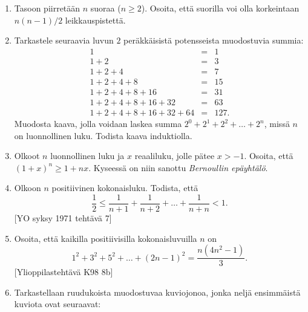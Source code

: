 \begin{enumerate}
\item Tasoon piirretään $n$ suoraa ($n\ge 2$). Osoita, että suorilla voi olla korkeintaan $n(n - 1)/2$ leikkauspistettä.

\item Tarkastele seuraavia luvun $2$ peräkkäisistä potensseista muodostuvia summia:
\[
\begin{array}{rcl}
1 &=& 1\\
1 + 2 &=& 3\\
1 + 2 + 4 &=& 7\\
1 + 2 + 4 + 8 &=& 15\\
1 + 2 + 4 + 8 + 16 &=& 31\\
1 + 2 + 4 + 8 + 16 + 32 &=& 63\\
1 + 2 + 4 + 8 + 16 + 32 + 64 &=& 127.
\end{array}
\]
Muodosta kaava, jolla voidaan laskea summa $2^0 + 2^1 + 2^2 + \ldots + 2^n$, missä $n$ on luonnollinen luku. Todista kaava induktiolla.

\item Olkoot $n$ luonnollinen luku ja $x$ reaaliluku, jolle pätee $x > -1$. Osoita, että $(1 + x)^n \ge 1 + nx$. Kyseessä on niin sanottu {\em Bernoullin epäyhtälö}.

\item Olkoon $n$ positiivinen kokonaisluku. Todista, että
\[
\frac{1}{2}\le\frac{1}{n+1}+\frac{1}{n+2}+\ldots +\frac{1}{n+n} <1.
\]
[YO syksy 1971 tehtävä 7]


\item
Osoita, että kaikilla positiivisilla kokonaisluvuilla $n$ on
\[
1^2+3^2+5^2+\ldots+(2n-1)^2 = \frac{n(4n^2-1)}{3}. 
\]
[Ylioppilastehtävä K98 8b]

\item Tarkastellaan ruudukoista muodostuvaa kuviojonoa, jonka neljä ensimmäistä kuviota ovat seuraavat:


\end{enumerate}
